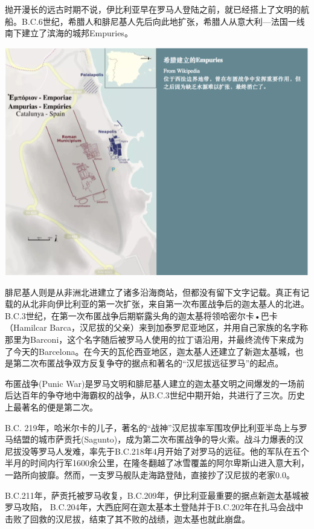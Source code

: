 \documentclass[
]{book}
\begin{document}
抛开漫长的远古时期不说，伊比利亚早在罗马人登陆之前，就已经搭上了文明的航船。B.C.6世纪，希腊人和腓尼基人先后向此地扩张，希腊人从意大利---法国一线南下建立了滨海的城邦Empuries。

\includegraphics[width=8.33in]{images/xt11}

腓尼基人则是从非洲北进建立了诸多沿海商站，但都没有留下文字记载。真正有记载的从北非向伊比利亚的第一次扩张，来自第一次布匿战争后的迦太基人的北进。B.C.3世纪，在第一次布匿战争后期崭露头角的迦太基将领哈密尔卡•巴卡（Hamilcar Barca，汉尼拔的父亲）来到加泰罗尼亚地区，并用自己家族的名字称那里为Barconi，这个名字随后被罗马人使用的拉丁语沿用，并最终流传下来成为了今天的Barcelona。在今天的瓦伦西亚地区，迦太基人还建立了新迦太基城，也是第二次布匿战争双方反复争夺的据点和著名的``汉尼拔远征罗马''的起点。

布匿战争(Punic War)是罗马文明和腓尼基人建立的迦太基文明之间爆发的一场前后达百年的争夺地中海霸权的战争，从B.C.3世纪中期开始，共进行了三次。历史上最著名的便是第二次。

B.C. 219年，哈米尔卡的儿子，著名的``战神''汉尼拔率军围攻伊比利亚半岛上与罗马结盟的城市萨贡托(Sagunto)，成为第二次布匿战争的导火索。战斗力爆表的汉尼拔没等罗马人发难，率先于B.C.218年4月开始了对罗马的远征。他的军队在五个半月的时间内行军1600余公里，在隆冬翻越了冰雪覆盖的阿尔卑斯山进入意大利，一路所向披靡。然而，一支罗马舰队走海路登陆，直接抄了汉尼拔的老家0.0。

B.C.211年，萨贡托被罗马收复，B.C.209年，伊比利亚最重要的据点新迦太基城被罗马攻陷， B.C.204年，大西庇阿在迦太基本土登陆并于B.C.202年在扎马会战中击败了回救的汉尼拔，结束了其不败的战绩，迦太基也就此崩盘。
\end{document}
